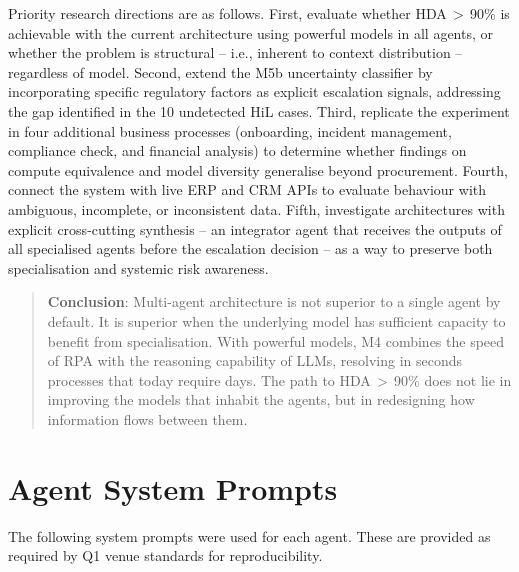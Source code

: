 \documentclass[preprint,12pt,authoryear]{elsarticle}
\begin{document}
Priority research directions are as follows.
First, evaluate whether HDA\,$>$\,90\% is achievable with the current
architecture using powerful models in all agents, or whether the problem is
structural -- i.e., inherent to context distribution -- regardless of model.
Second, extend the M5b uncertainty classifier by incorporating specific
regulatory factors as explicit escalation signals, addressing the gap identified
in the 10 undetected HiL cases.
Third, replicate the experiment in four additional business processes (onboarding,
incident management, compliance check, and financial analysis) to determine
whether findings on compute equivalence and model diversity generalise beyond
procurement.
Fourth, connect the system with live ERP and CRM APIs to evaluate behaviour
with ambiguous, incomplete, or inconsistent data.
Fifth, investigate architectures with explicit cross-cutting synthesis -- an
integrator agent that receives the outputs of all specialised agents before the
escalation decision -- as a way to preserve both specialisation and systemic
risk awareness.

\begin{quote}
\textbf{Conclusion}: Multi-agent architecture is not superior to a single agent
by default.
It is superior when the underlying model has sufficient capacity to benefit from
specialisation.
With powerful models, M4 combines the speed of RPA with the reasoning capability
of LLMs, resolving in seconds processes that today require days.
The path to HDA\,$>$\,90\% does not lie in improving the models that inhabit the
agents, but in redesigning how information flows between them.
\end{quote}




\appendix

\section{Agent System Prompts}
\label{app:prompts}

The following system prompts were used for each agent.
These are provided as required by Q1 venue standards for reproducibility.
\end{document}
